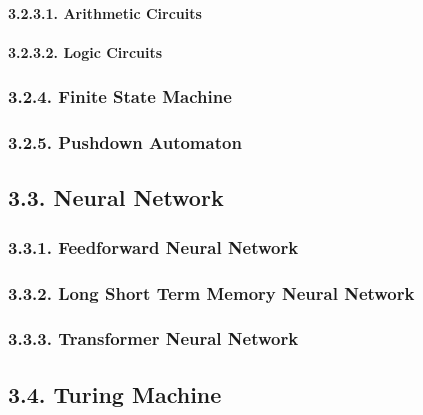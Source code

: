 \documentclass[
]{article}
\begin{document}
\hypertarget{arithmetic-circuits}{%
\paragraph{3.2.3.1. Arithmetic Circuits}\label{arithmetic-circuits}}

\hypertarget{logic-circuits}{%
\paragraph{3.2.3.2. Logic Circuits}\label{logic-circuits}}

\hypertarget{finite-state-machine}{%
\subsubsection{3.2.4. Finite State Machine}\label{finite-state-machine}}

\hypertarget{pushdown-automaton}{%
\subsubsection{3.2.5. Pushdown Automaton}\label{pushdown-automaton}}

\hypertarget{neural-network}{%
\subsection{3.3. Neural Network}\label{neural-network}}

\hypertarget{feedforward-neural-network}{%
\subsubsection{3.3.1. Feedforward Neural
Network}\label{feedforward-neural-network}}

\hypertarget{long-short-term-memory-neural-network}{%
\subsubsection{3.3.2. Long Short Term Memory Neural
Network}\label{long-short-term-memory-neural-network}}

\hypertarget{transformer-neural-network}{%
\subsubsection{3.3.3. Transformer Neural
Network}\label{transformer-neural-network}}

\hypertarget{turing-machine}{%
\subsection{3.4. Turing Machine}\label{turing-machine}}
\end{document}
